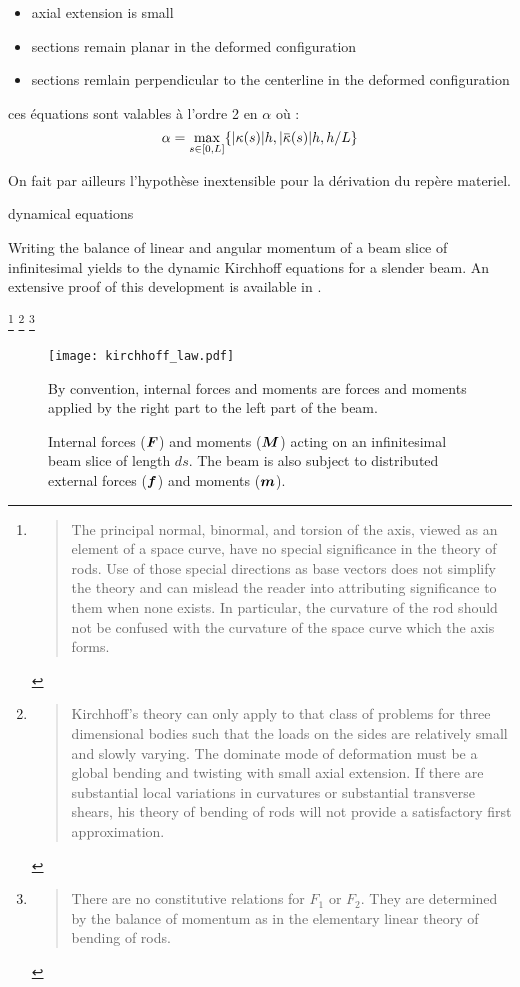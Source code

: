 \begin{itemize}
	\item axial extension is small
	\item sections remain planar in the deformed configuration
	\item sections remlain perpendicular to the centerline in the deformed configuration
\end{itemize}

ces équations sont valables à l'ordre 2 en $\alpha$ où :
\begin{equation}
	\alpha = \max_{s \in [0,L]} \{ \abs{\kappa(s)} h, \abs{\overbar{\kappa}(s)} h, h/L\}
\end{equation}

On fait par ailleurs l'hypothèse inextensible pour la dérivation du repère materiel.

dynamical equations

Writing the balance of linear and angular momentum of a beam slice of infinitesimal yields to the dynamic Kirchhoff equations for a slender beam. An extensive proof of this development is available in \cite{Dill1992}.

\footnote{\blockcquote[p.~5]{Dill1992}{The principal normal, binormal, and torsion of the axis, viewed as an element of a space curve, have no special significance in the theory of rods. Use of those special directions as base vectors does not simplify the theory and can mislead the reader into attributing significance to them when none exists. In particular, the curvature of the rod should not be confused with the curvature of the space curve which the axis forms.}}
\footnote{\blockcquote[p.~18]{Dill1992}{Kirchhoff's theory can only apply to that class of problems for three dimensional bodies such that the loads on the sides are relatively small and slowly varying. The dominate mode of deformation must be a global bending and twisting with small axial extension. If there are substantial local variations in curvatures or substantial transverse shears, his theory of bending of rods will not provide a satisfactory first approximation.}}
\footnote{\blockcquote[p.~15]{Dill1992}{There are no constitutive relations for $F_1$ or $F_2$. They are determined by the balance of momentum as in the elementary linear theory of bending of rods.}}

\begin{figure}[t]
	\centering
	\texttt{[image: kirchhoff\_law.pdf]}
	\caption{Internal forces ($\boldsymbol{F}$) and moments ($\boldsymbol{M}$) acting on an infinitesimal beam slice of length $ds$. The beam is also subject to distributed external forces ($\boldsymbol{f}$) and moments ($\boldsymbol{m}$).} By convention, internal forces and moments are forces and moments applied by the right part to the left part of the beam.
	\label{fig:5_0}
\end{figure}

